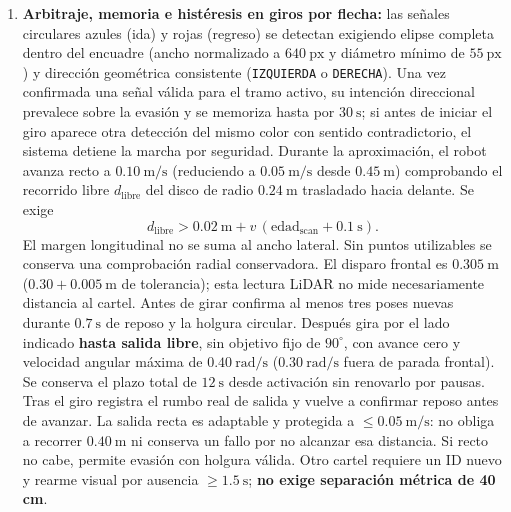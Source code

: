 \documentclass[11pt,a4paper]{article}
\begin{document}
\begin{enumerate}
  \item \textbf{Arbitraje, memoria e histéresis en giros por flecha:} las
  señales circulares azules (ida) y rojas (regreso) se detectan exigiendo
  elipse completa dentro del encuadre (ancho normalizado a $640\ \mathrm{px}$ y
  diámetro mínimo de $55\ \mathrm{px}$) y dirección geométrica consistente
  (\texttt{IZQUIERDA} o \texttt{DERECHA}). Una vez confirmada una señal válida
  para el tramo activo, su intención direccional prevalece sobre la evasión y
  se memoriza hasta por $30\ \mathrm{s}$; si antes de iniciar el giro aparece
  otra detección del mismo color con sentido contradictorio, el sistema detiene
  la marcha por seguridad. Durante la aproximación, el robot avanza recto a
  $0.10\ \mathrm{m/s}$ (reduciendo a $0.05\ \mathrm{m/s}$ desde $0.45\ \mathrm{m}$)
  comprobando el recorrido libre $d_{\mathrm{libre}}$ del disco de radio
  $0.24\ \mathrm{m}$ trasladado hacia delante. Se exige
  \begin{equation}
    d_{\mathrm{libre}} > 0.02\ \mathrm{m}
      + v\,(\mathrm{edad}_{\mathrm{scan}}+0.1\ \mathrm{s}).
  \end{equation}
  El margen longitudinal no se suma al ancho lateral. Sin puntos utilizables
  se conserva una comprobación radial conservadora. El disparo frontal es
  $0.305\ \mathrm{m}$ ($0.30+0.005\ \mathrm{m}$ de tolerancia); esta lectura
  LiDAR no mide necesariamente distancia al cartel. Antes de girar confirma
  al menos tres poses nuevas durante $0.7\ \mathrm{s}$ de reposo y la holgura
  circular. Después gira por el lado indicado \textbf{hasta salida libre}, sin
  objetivo fijo de $90^\circ$, con avance cero y velocidad angular máxima de
  $0.40\ \mathrm{rad/s}$ ($0.30\ \mathrm{rad/s}$ fuera de parada frontal).
  Se conserva el plazo total de $12\ \mathrm{s}$ desde activación sin renovarlo
  por pausas. Tras el giro registra el rumbo real de salida y vuelve a confirmar
  reposo antes de avanzar. La salida recta es adaptable y protegida a
  $\le0.05\ \mathrm{m/s}$: no obliga a recorrer $0.40\ \mathrm{m}$ ni conserva
  un fallo por no alcanzar esa distancia. Si recto no cabe, permite evasión con
  holgura válida. Otro cartel requiere un ID nuevo y rearme visual por ausencia
  $\ge1.5\ \mathrm{s}$; \textbf{no exige separación métrica de 40 cm}.



\end{enumerate}
\end{document}
